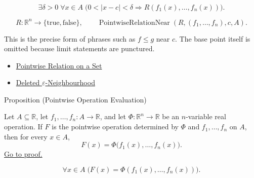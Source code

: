 \begin{remark*}
\[
  \exists\delta>0\;\forall x\in A\;
  \bigl(0<|x-c|<\delta
  \Rightarrow R(f_1(x),\ldots,f_n(x))\bigr).
\]
\end{remark*}

\begin{remark*}
\[
  R\colon \mathbb{R}^n\to\{\mathrm{true},\mathrm{false}\},\qquad
  \operatorname{PointwiseRelationNear}(R,(f_1,\ldots,f_n),c,A).
\]
\end{remark*}

\begin{remark*}[Interpretation]
This is the precise form of phrases such as \(f\leq g\) near \(c\).  The
base point itself is omitted because limit statements are punctured.
\end{remark*}

\begin{dependencies}
\begin{itemize}
  \item \hyperref[def:pointwise-relation-on-set]{Pointwise Relation on a Set}
  \item \hyperref[def:deleted-epsilon-neighbourhood]{Deleted \(\varepsilon\)-Neighbourhood}
\end{itemize}
\end{dependencies}

\begin{propositionbox}{Proposition (Pointwise Operation Evaluation)}
\begin{proposition}
\label{prop:pointwise-operation-evaluation}
Let \(A\subseteq\mathbb{R}\), let \(f_1,\ldots,f_n:A\to\mathbb{R}\),
and let \(\Phi:\mathbb{R}^n\to\mathbb{R}\) be an \(n\)-variable real
operation.  If \(F\) is the pointwise operation determined by
\(\Phi\) and \(f_1,\ldots,f_n\) on \(A\), then for every \(x\in A\),
\[
  F(x)
  =
  \Phi\bigl(f_1(x),\ldots,f_n(x)\bigr).
\]
\hyperref[prf:pointwise-operation-evaluation]{Go to proof.}
\end{proposition}
\end{propositionbox}

\begin{remark*}
\[
  \forall x\in A\;
  \bigl(F(x)=\Phi(f_1(x),\ldots,f_n(x))\bigr).
\]
\end{remark*}

